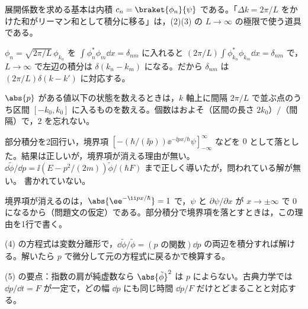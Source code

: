 \begin{rikai}
  \item 展開係数を求める基本は内積 $c_{n}=\braket{\phi_{n}}{\psi}$ である。「$\Delta k=2\pi/L$ をかけた和がリーマン和として積分に移る」は，(2)(3) の $L\to\infty$ の極限で使う道具である。
  \item $\phi_{n}=\sqrt{2\pi/L}\,\phi_{k_{n}}$ を $\int\phi_{n}^{*}\phi_{m}\dd x=\delta_{nm}$ に入れると $(2\pi/L)\int\phi_{k_{n}}^{*}\phi_{k_{m}}\dd x=\delta_{nm}$ で，$L\to\infty$ で左辺の積分は $\delta(k_{n}-k_{m})$ になる。だから $\delta_{nm}$ は $(2\pi/L)\delta(k-k')$ に対応する。
  \item $\abs{p}$ がある値以下の状態を数えるときは，$k$ 軸上に間隔 $2\pi/L$ で並ぶ点のうち区間 $[-k_{0},k_{0}]$ に入るものを数える。個数はおよそ（区間の長さ $2k_{0}$）$/$（間隔）で，$2$ を忘れない。
\end{rikai}
\begin{kotaeran}
   部分積分を2回行い，境界項 $[-(\hbar/(\ii p))\ee^{-\ii px/\hbar}\psi]_{-\infty}^{\infty}$ などを $0$ として落とした。結果は正しいが，境界項が消える理由が無い。
   $\dd\tilde{\phi}/\dd p=\ii(E-p^{2}/(2m))\tilde{\phi}/(\hbar F)$ まで正しく導いたが，問われている解が無い。
   書かれていない。
\end{kotaeran}
\begin{rikai}
  \item 境界項が消えるのは，$\abs{\ee^{-\ii px/\hbar}}=1$ で，$\psi$ と $\partial\psi/\partial x$ が $x\to\pm\infty$ で $0$ になるから（問題文の仮定）である。部分積分で境界項を落とすときは，この理由を1行で書く。
  \item (4) の方程式は変数分離形で，$\dd\tilde{\phi}/\tilde{\phi}=(\text{$p$ の関数})\dd p$ の両辺を積分すれば解ける。解いたら $p$ で微分して元の方程式に戻るかで検算する。
  \item (5) の要点：指数の肩が純虚数なら $\abs{\tilde{\phi}}^{2}$ は $p$ によらない。古典力学では $\dd p/\dd t=F$ が一定で，どの幅 $\dd p$ にも同じ時間 $\dd p/F$ だけとどまることと対応する。
\end{rikai}
